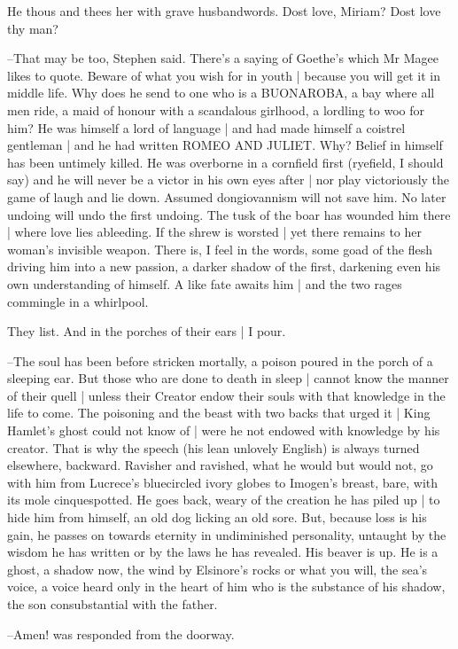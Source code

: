 He thous and thees her with grave husbandwords.
Dost love,
Miriam?
Dost love thy man?

--That may be too,
Stephen said.
There's a saying of Goethe's which Mr Magee likes to quote.
Beware of what you wish for in youth |
because you will get it in middle life.
Why does he send to one who is a BUONAROBA,
a bay where all men ride,
a maid of honour with a scandalous girlhood,
a lordling to woo for him?
He was himself a lord of language |
and had made himself a coistrel gentleman |
and he had written ROMEO AND JULIET.
Why?
Belief in himself has been untimely killed.
He was overborne in a cornfield first
(ryefield, I should say)
and he will never be a victor in his own eyes after |
nor play victoriously the game of laugh and lie down.
Assumed dongiovannism will not save him.
No later undoing will undo the first undoing.
The tusk of the boar has wounded him there |
where love lies ableeding.
If the shrew is worsted |
yet there remains to her woman's invisible weapon.
There is,
I feel in the words,
some goad of the flesh driving him into a new passion,
a darker shadow of the first,
darkening even his own understanding of himself.
A like fate awaits him |
and the two rages commingle in a whirlpool.

They list.
And in the porches of their ears |
I pour.

--The soul has been before stricken mortally,
a poison poured in the porch of a sleeping ear.
But those who are done to death in sleep |
cannot know the manner of their quell |
unless their Creator endow their souls with that knowledge in the life to come.
The poisoning and the beast with two backs that urged it |
King Hamlet's ghost could not know of |
were he not endowed with knowledge by his creator.
That is why the speech
(his lean unlovely English)
is always turned elsewhere, backward.
Ravisher and ravished,
what he would but would not,
go with him from Lucrece's bluecircled ivory globes to Imogen's breast,
bare, with its mole cinquespotted.
He goes back,
weary of the creation he has piled up |
to hide him from himself,
an old dog licking an old sore.
But, because loss is his gain,
he passes on towards eternity in undiminished personality,
untaught by the wisdom he has written or by the laws he has revealed.
His beaver is up.
He is a ghost, a shadow now,
the wind by Elsinore's rocks or what you will,
the sea's voice,
a voice heard only in the heart of him who is the substance of his shadow,
the son consubstantial with the father.

--Amen!
was responded from the doorway.

